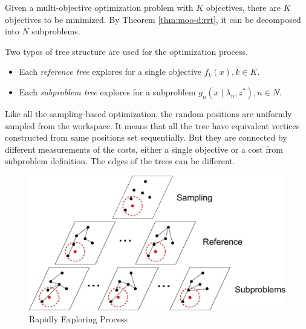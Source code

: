 \documentclass[conference]{IEEEtran}
\begin{document}
Given a multi-objective optimization problem with $ K $ objectives,
there are $ K $ objectives to be minimized. 
By Theorem \ref{thm:moo-d:rrt}, it can be decomposed into $ N $ subproblems.

Two types of tree structure are used for the optimization process.
\begin{itemize}
\item Each \emph{reference tree} explores for a single objective $ f_{k} (x), k \in K $. 
\item Each \emph{subproblem tree} explores for a subproblem $ g_{n} ( x \mid \lambda_{n} , z^{*} ) , n \in N $.
\end{itemize}

Like all the sampling-based optimization, the random positions are uniformly sampled from the workspace.
It means that all the tree have equivalent vertices constructed from same positions set sequentially.
But they are connected by different measurements of the costs, either a single objective or a cost from subproblem definition.
The edges of the trees can be different.

\begin{figure}[H]
\centering
\includegraphics[width=0.9\linewidth]{./fig/MORRTstar}
\caption{Rapidly Exploring Process}
\label{fig:MORRTstar}
\end{figure}
\end{document}
